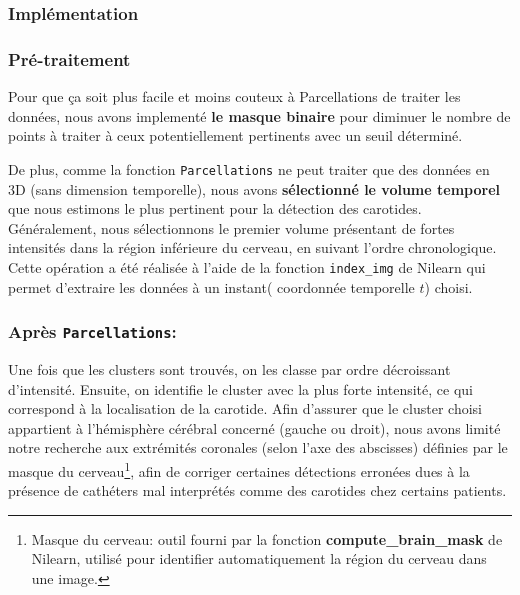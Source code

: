 \documentclass[a4paper]{article}
\begin{document}
            \subsubsection*{Implémentation }
    
            \subsubsection*{Pré-traitement}
                Pour que ça soit plus facile et moins couteux à Parcellations de traiter les données, nous avons implementé \textbf{le masque binaire} pour diminuer le nombre de points à traiter à ceux potentiellement pertinents avec un seuil déterminé.

                \vspace{0.2cm}

                De plus, comme la fonction \texttt{Parcellations} ne peut traiter que des données en 3D (sans dimension temporelle), nous avons \textbf{sélectionné le volume temporel} que nous estimons le plus pertinent pour la détection des carotides. Généralement, nous sélectionnons le premier volume présentant de fortes intensités dans la région inférieure du cerveau, en suivant l’ordre chronologique.
                Cette opération a été réalisée à l'aide de la fonction \texttt{index\_img} de Nilearn qui permet d'extraire les données à un instant( coordonnée temporelle $t$) choisi.

\vspace{0.2cm}

                    
            \subsubsection*{Après \texttt{Parcellations}:}
                Une fois que les clusters sont trouvés, on les classe par ordre décroissant d'intensité. Ensuite, on identifie le cluster avec la plus forte intensité, ce qui correspond à la localisation de la carotide.
                Afin d’assurer que le cluster choisi appartient à l'hémisphère cérébral concerné (gauche ou droit), nous avons limité notre recherche aux extrémités coronales (selon l’axe des abscisses) définies par le masque du cerveau\footnote{Masque du cerveau: outil fourni par la fonction \textbf{compute\_brain\_mask} de Nilearn, utilisé pour identifier automatiquement la région du cerveau dans une image.}, afin de corriger certaines détections erronées dues à la présence de cathéters mal interprétés comme des carotides chez certains patients.
\end{document}

